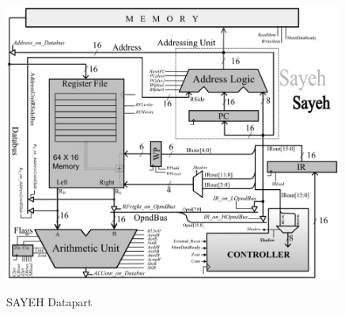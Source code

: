 \documentclass{report}
\begin{document}
\begin{figure}[ht]
	\centering
	\includegraphics[width=0.99\textwidth]{figs/fig3}\\
	\caption{SAYEH Datapart}
\end{figure}
\end{document}
